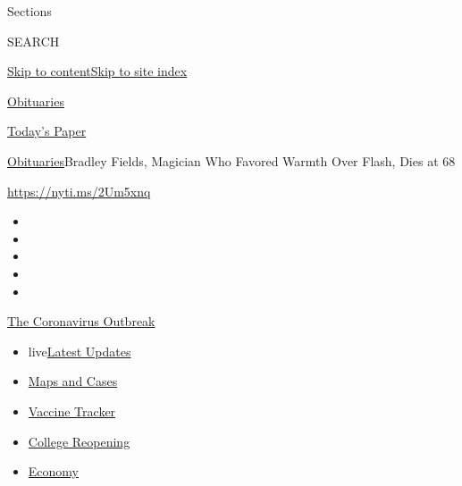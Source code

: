 Sections

SEARCH

\protect\hyperlink{site-content}{Skip to
content}\protect\hyperlink{site-index}{Skip to site index}

\href{https://www.nytimes3xbfgragh.onion/section/obituaries}{Obituaries}

\href{https://myaccount.nytimes3xbfgragh.onion/auth/login?response_type=cookie\&client_id=vi}{}

\href{https://www.nytimes3xbfgragh.onion/section/todayspaper}{Today's
Paper}

\href{/section/obituaries}{Obituaries}\textbar{}Bradley Fields, Magician
Who Favored Warmth Over Flash, Dies at 68

\url{https://nyti.ms/2Um5xnq}

\begin{itemize}
\item
\item
\item
\item
\item
\end{itemize}

\href{https://www.nytimes3xbfgragh.onion/news-event/coronavirus?action=click\&pgtype=Article\&state=default\&region=TOP_BANNER\&context=storylines_menu}{The
Coronavirus Outbreak}

\begin{itemize}
\tightlist
\item
  live\href{https://www.nytimes3xbfgragh.onion/2020/08/04/world/coronavirus-covid-19.html?action=click\&pgtype=Article\&state=default\&region=TOP_BANNER\&context=storylines_menu}{Latest
  Updates}
\item
  \href{https://www.nytimes3xbfgragh.onion/interactive/2020/us/coronavirus-us-cases.html?action=click\&pgtype=Article\&state=default\&region=TOP_BANNER\&context=storylines_menu}{Maps
  and Cases}
\item
  \href{https://www.nytimes3xbfgragh.onion/interactive/2020/science/coronavirus-vaccine-tracker.html?action=click\&pgtype=Article\&state=default\&region=TOP_BANNER\&context=storylines_menu}{Vaccine
  Tracker}
\item
  \href{https://www.nytimes3xbfgragh.onion/2020/08/02/us/covid-college-reopening.html?action=click\&pgtype=Article\&state=default\&region=TOP_BANNER\&context=storylines_menu}{College
  Reopening}
\item
  \href{https://www.nytimes3xbfgragh.onion/live/2020/08/03/business/stock-market-today-coronavirus?action=click\&pgtype=Article\&state=default\&region=TOP_BANNER\&context=storylines_menu}{Economy}
\end{itemize}

